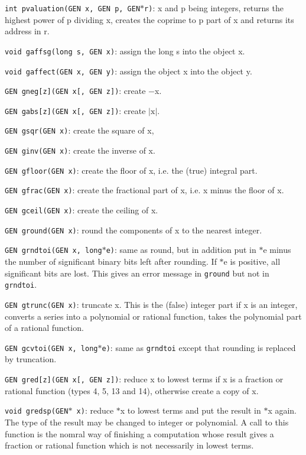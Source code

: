 {\tt int pvaluation(GEN x, GEN p, GEN$*$r)}: x and p being integers, returns 
the highest power of p dividing x, creates the coprime to p part of x and 
returns its address in r.


{\tt void gaffsg(long s, GEN x)}: assign the long s into the object x.

{\tt void gaffect(GEN x, GEN y)}: assign the object x into the object y.


{\tt GEN gneg[z](GEN x[, GEN z])}: create $-$x.

{\tt GEN gabs[z](GEN x[, GEN z])}: create $|\text{x}|$.

{\tt GEN gsqr(GEN x)}: create the square of x,

{\tt GEN ginv(GEN x)}: create the inverse of x.

{\tt GEN gfloor(GEN x)}: create the floor of x, i.e. the (true) integral part.

{\tt GEN gfrac(GEN x)}: create the fractional part of x, i.e. x minus the floor
of x.

{\tt GEN gceil(GEN x)}: create the ceiling of x.

{\tt GEN ground(GEN x)}: round the components of x to the nearest integer.

{\tt GEN grndtoi(GEN x, long$*$e)}: same as round, but in addition put in
$*$e minus the number of significant binary bits left after rounding. If
$*$e is positive, all significant bits are lost. This gives an error message
in {\tt ground} but not in {\tt grndtoi}.

{\tt GEN gtrunc(GEN x)}: truncate x. This is the (false) integer part if x is 
an integer, converts a series into a polynomial or rational function, takes
the polynomial part of a rational function.

{\tt GEN gcvtoi(GEN x, long$*$e)}: same as {\tt grndtoi} except that rounding
is replaced by truncation.

{\tt GEN gred[z](GEN x[, GEN z])}: reduce x to lowest terms if x is a fraction
or rational function (types 4, 5, 13 and 14), otherwise create a copy of x.

{\tt void gredsp(GEN$*$ x)}: reduce $*$x to lowest terms and put the result
in $*$x again. The type of the result may be changed to integer or polynomial.
A call to this function is the nomral way of finishing a computation whose
result gives a fraction or rational function which is not necessarily in
lowest terms.

